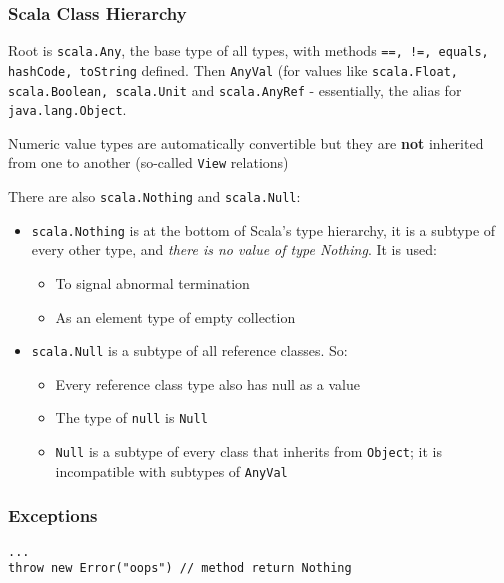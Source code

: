 \documentclass{scrartcl}
\newcommand{\term}[1]{\verb~#1~} %
\begin{document}
\subsubsection{Scala Class Hierarchy}
\label{sec:ScalaClassHierarchy}

Root is \lstinline|scala.Any|, the base type of all types, with methods
\lstinline|==, !=, equals, hashCode, toString| defined. Then \lstinline|AnyVal|
(for values like \lstinline|scala.Float, scala.Boolean, scala.Unit| and
\lstinline|scala.AnyRef| - essentially, the alias for
\lstinline|java.lang.Object|.

Numeric value types are automatically convertible but they are {\bf not}
inherited from one to another (so-called \term{View} relations)

There are also \lstinline|scala.Nothing| and \lstinline|scala.Null|:
\begin{itemize}
\item \lstinline|scala.Nothing| is at the bottom of Scala's type hierarchy, it
  is a subtype of every other type, and {\it there is no value of type Nothing}.
  It is used:
  \begin{itemize}
  \item To signal abnormal termination
  \item As an element type of empty collection
  \end{itemize}

\item \lstinline|scala.Null| is a subtype of all reference classes. So:
  \begin{itemize}
  \item Every reference class type also has null as a value
  \item The type of \lstinline|null| is \lstinline|Null|
  \item \lstinline|Null| is a subtype of every class that inherits from
    \lstinline|Object|; it is incompatible with subtypes of \lstinline|AnyVal|
  \end{itemize}
\end{itemize}

\subsubsection{Exceptions}
\label{sec:Exceptions}

\begin{lstlisting}
...
throw new Error("oops") // method return Nothing
\end{lstlisting}
\end{document}
